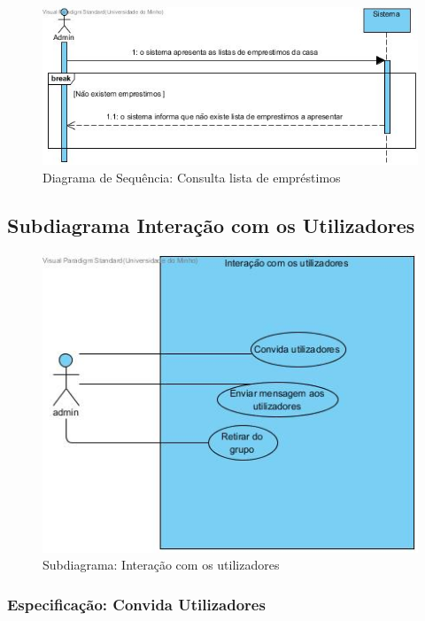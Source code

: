 \begin{figure}[htb!]
	\centering
	\includegraphics[scale=0.5]{imagens/DiagramaSeq/ConsultarListaEmprestimos}  
	\caption{Diagrama de Sequência: Consulta lista de empréstimos}  
\end{figure}



\newpage

\subsection{Subdiagrama Interação com os Utilizadores}
\begin{figure}[htb!]
	\centering
	\includegraphics[scale=0.6]{imagens/UseCase/InteracaoComOsUtilizadores}  
	\caption{Subdiagrama: Interação com os utilizadores }  
\end{figure}

\subsubsection{Especificação: Convida Utilizadores }

